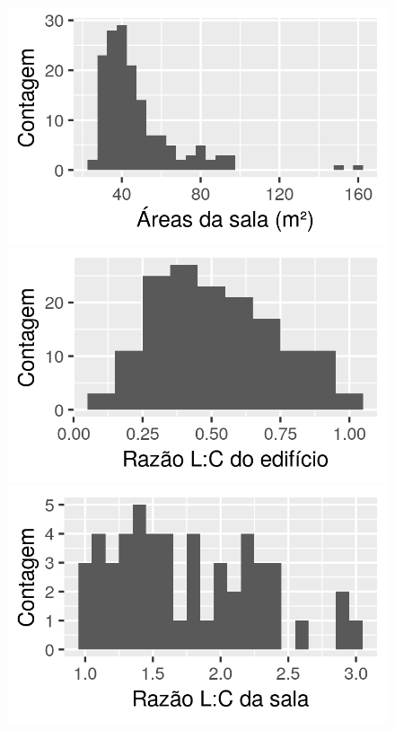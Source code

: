 \documentclass[brazil,hardcopy,openany,a4paper]{ufscthesis}
\begin{document}
\begin{figure}[h]
\begin{minipage}{.5\textwidth}
		\end{minipage}%
		\begin{minipage}{.5\textwidth}
			\centering
			\includegraphics[width=\linewidth]{img/hist_area_zonas.png}
		\end{minipage}
		\centering
		\begin{minipage}{.5\textwidth}
			\centering
			\includegraphics[width=\linewidth]{img/hist_ratio_edificio.png}
		\end{minipage}%
		\begin{minipage}{.5\textwidth}
			\centering
			\includegraphics[width=\linewidth]{img/hist_ratio_sala.png}
		\end{minipage}
	\end{figure}
\end{document}
